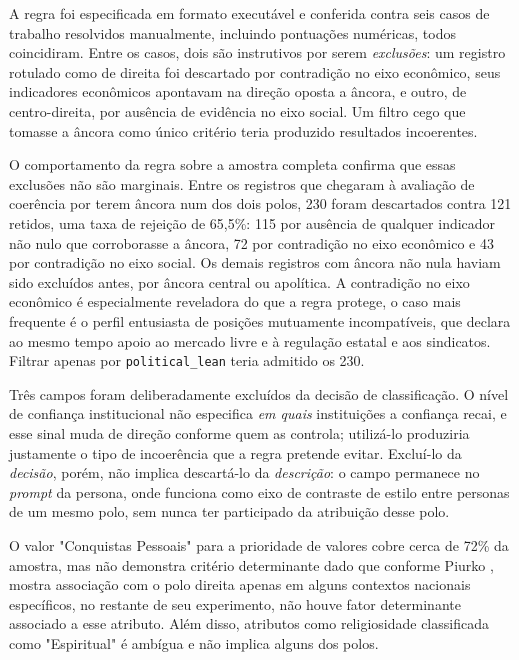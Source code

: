 A regra foi especificada em formato executável e conferida contra seis casos de
trabalho resolvidos manualmente, incluindo pontuações numéricas, todos
coincidiram. Entre os casos, dois são instrutivos por serem \textit{exclusões}:
um registro rotulado como de direita foi descartado por contradição no eixo
econômico, seus indicadores econômicos apontavam na direção oposta a âncora,
e outro, de centro-direita, por ausência de evidência no eixo social. Um filtro cego que
tomasse a âncora como único critério teria produzido resultados incoerentes.

O comportamento da regra sobre a amostra completa confirma que essas exclusões
não são marginais. Entre os registros que chegaram à avaliação de coerência
por terem âncora num dos dois polos, 230 foram descartados contra 121
retidos, uma taxa de rejeição de 65,5\%: 115 por ausência de qualquer
indicador não nulo que corroborasse a âncora, 72 por contradição no eixo
econômico e 43 por contradição no eixo social. Os demais registros com âncora
não nula haviam sido excluídos antes, por âncora central ou apolítica. A
contradição no eixo econômico é
especialmente reveladora do que a regra protege, o caso mais frequente é o
perfil entusiasta de posições mutuamente incompatíveis, que declara ao mesmo
tempo apoio ao mercado livre e à regulação estatal e aos sindicatos. Filtrar
apenas por \texttt{political\_lean} teria admitido os 230.

Três campos foram deliberadamente excluídos da decisão de classificação. O
nível de confiança institucional não especifica \textit{em quais} instituições
a confiança recai, e esse sinal muda de direção conforme quem as controla;
utilizá-lo produziria justamente o tipo de incoerência que a regra pretende
evitar. Excluí-lo da \textit{decisão}, porém, não implica descartá-lo da
\textit{descrição}: o campo permanece no \textit{prompt} da persona, onde
funciona como eixo de contraste de estilo entre personas de um mesmo polo,
sem nunca ter participado da atribuição desse polo.

O valor "Conquistas Pessoais" para a prioridade de valores cobre cerca de 72\% da amostra, mas não demonstra critério determinante dado que conforme Piurko \cite{piurko2011basic}, mostra associação com o polo direita apenas em alguns contextos nacionais específicos, no restante de seu experimento, não houve fator determinante associado a esse atributo. Além disso, atributos como religiosidade classificada como "Espiritual" é ambígua e não implica alguns dos polos. 

